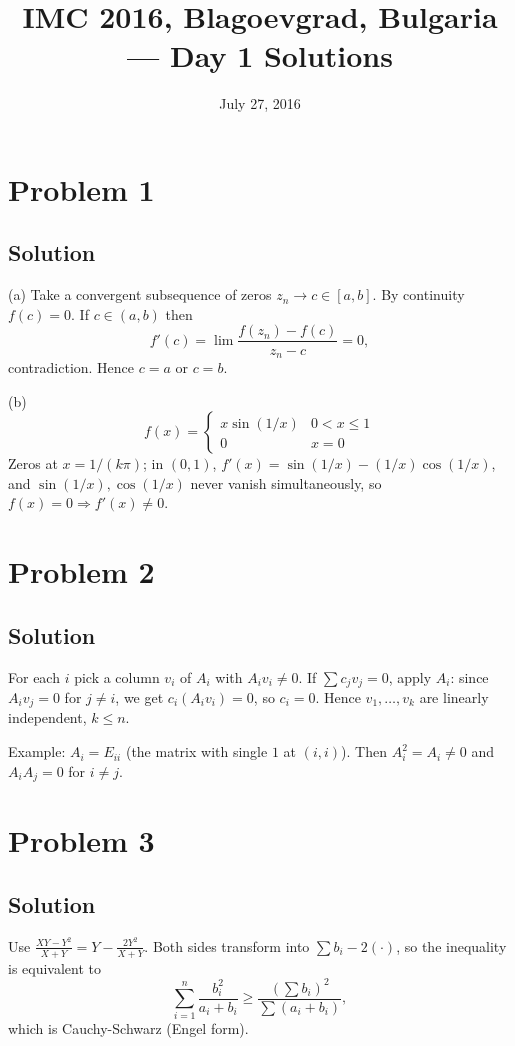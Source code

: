 \documentclass{article}
\title{IMC 2016, Blagoevgrad, Bulgaria --- Day 1 Solutions}
\date{July 27, 2016}
\begin{document}
\maketitle

\section*{Problem 1}
\subsection*{Solution}
(a) Take a convergent subsequence of zeros $z_n \to c \in [a,b]$. By continuity $f(c) = 0$. If $c \in (a,b)$ then
\[ f'(c) = \lim \frac{f(z_n) - f(c)}{z_n - c} = 0, \]
contradiction. Hence $c = a$ or $c = b$.

(b)
\[ f(x) = \begin{cases} x \sin(1/x) & 0 < x \le 1 \\ 0 & x = 0 \end{cases} \]
Zeros at $x = 1/(k\pi)$; in $(0,1)$, $f'(x) = \sin(1/x) - (1/x)\cos(1/x)$, and $\sin(1/x), \cos(1/x)$ never vanish simultaneously, so $f(x) = 0 \Rightarrow f'(x) \ne 0$.

\section*{Problem 2}
\subsection*{Solution}
For each $i$ pick a column $v_i$ of $A_i$ with $A_i v_i \ne 0$. If $\sum c_j v_j = 0$, apply $A_i$: since $A_i v_j = 0$ for $j \ne i$, we get $c_i (A_i v_i) = 0$, so $c_i = 0$. Hence $v_1, \dots, v_k$ are linearly independent, $k \le n$.

Example: $A_i = E_{ii}$ (the matrix with single $1$ at $(i,i)$). Then $A_i^2 = A_i \ne 0$ and $A_i A_j = 0$ for $i \ne j$.

\section*{Problem 3}
\subsection*{Solution}
Use $\frac{XY - Y^2}{X+Y} = Y - \frac{2Y^2}{X+Y}$. Both sides transform into $\sum b_i - 2(\cdot)$, so the inequality is equivalent to
\[ \sum_{i=1}^n \frac{b_i^2}{a_i + b_i} \ge \frac{(\sum b_i)^2}{\sum (a_i + b_i)}, \]
which is Cauchy-Schwarz (Engel form).
\end{document}
